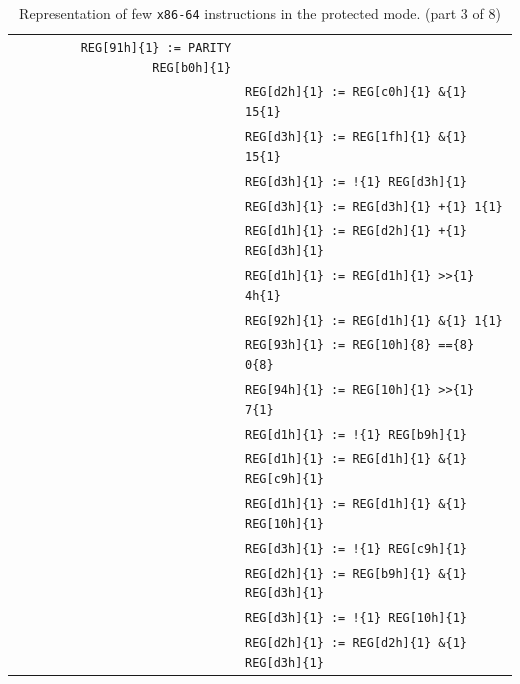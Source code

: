 \documentclass[10pt,twocolumn]{article}
\begin{document}
\begin{table}[!h]
\begin{center}
\begin{tabular}{r|rl}
& \texttt{REG[91h]\{1\} := PARITY REG[b0h]\{1\}} \\ & %

& \texttt{REG[d2h]\{1\} := REG[c0h]\{1\} \&\{1\} 15\{1\}} \\ & %
& \texttt{REG[d3h]\{1\} := REG[1fh]\{1\} \&\{1\} 15\{1\}} \\ & %

& \texttt{REG[d3h]\{1\} := !\{1\} REG[d3h]\{1\}} \\ & %
& \texttt{REG[d3h]\{1\} := REG[d3h]\{1\} +\{1\} 1\{1\}} \\ & %

& \texttt{REG[d1h]\{1\} := REG[d2h]\{1\} +\{1\} REG[d3h]\{1\}} \\ & %
& \texttt{REG[d1h]\{1\} := REG[d1h]\{1\} >>\{1\} 4h\{1\}} \\ & %
& \texttt{REG[92h]\{1\} := REG[d1h]\{1\} \&\{1\} 1\{1\}} \\ & %

& \texttt{REG[93h]\{1\} := REG[10h]\{8\} ==\{8\} 0\{8\}} \\ & %
& \texttt{REG[94h]\{1\} := REG[10h]\{1\} >>\{1\} 7\{1\}} \\ & %

& \texttt{REG[d1h]\{1\} := !\{1\} REG[b9h]\{1\}} \\ & %
& \texttt{REG[d1h]\{1\} := REG[d1h]\{1\} \&\{1\} REG[c9h]\{1\}} \\ & %
& \texttt{REG[d1h]\{1\} := REG[d1h]\{1\} \&\{1\} REG[10h]\{1\}} \\ & %
& \texttt{REG[d3h]\{1\} := !\{1\} REG[c9h]\{1\}} \\ & %
& \texttt{REG[d2h]\{1\} := REG[b9h]\{1\} \&\{1\} REG[d3h]\{1\}} \\ & %
& \texttt{REG[d3h]\{1\} := !\{1\} REG[10h]\{1\}} \\ & %
& \texttt{REG[d2h]\{1\} := REG[d2h]\{1\} \&\{1\} REG[d3h]\{1\}} %

\end{tabular}
\end{center}
\caption{Representation of few \texttt{x86-64} instructions in the
protected mode. (part 3 of 8)}
\end{table}

\clearpage
\end{document}
